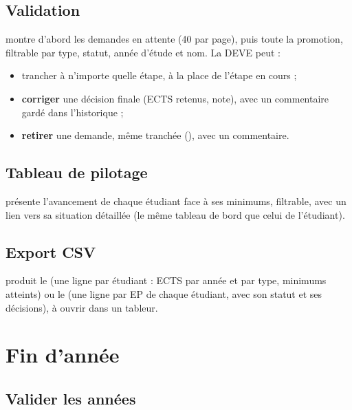 \documentclass[11pt,a4paper]{article}
\begin{document}
\subsection{Validation}

 montre d'abord les demandes en attente (40 par page), puis toute la
promotion, filtrable par type, statut, année d'étude et nom. La DEVE peut :
\begin{itemize}
  \item trancher à n'importe quelle étape, à la place de l'étape en cours ;
  \item \textbf{corriger} une décision finale (ECTS retenus, note), avec un commentaire gardé
    dans l'historique ;
  \item \textbf{retirer} une demande, même tranchée (), avec un
    commentaire.
\end{itemize}


\subsection{Tableau de pilotage}

 présente l'avancement de chaque étudiant face à ses minimums,
filtrable, avec un lien vers sa situation détaillée (le même tableau de bord que celui de
l'étudiant).


\subsection{Export CSV}

 produit le  (une ligne par étudiant : ECTS par
année et par type, minimums atteints) ou le  (une ligne par EP de chaque
étudiant, avec son statut et ses décisions), à ouvrir dans un tableur.

\section{Fin d'année}\label{sec:finannee}

\subsection{Valider les années}
\end{document}
